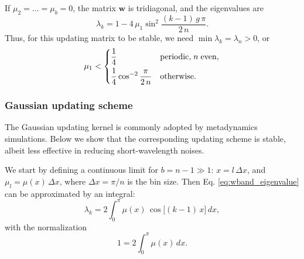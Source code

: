 \documentclass[reprint, floatfix]{revtex4-1}
\begin{document}
If $\mu_2 = \dots = \mu_b = 0$,
the matrix $\mathbf w$ is tridiagonal,
and the eigenvalues are
\begin{equation}
  \lambda_k
  =
  1 -
  4 \, \mu_1 \sin^2
  \frac{ (k - 1) \, g \, \pi }
       {       2 \, n        }
  .
\label{eq:wnn_eigenvalue}
\end{equation}
%
Thus, for this updating matrix to be stable,
we need
$\min \lambda_k = \lambda_n > 0$,
or
\begin{equation}
  \mu_1 <
  \begin{dcases}
    \frac 1 4
    & \mathrm{periodic, \;} n \mathrm{ \; even,}
    \\
    \frac 1 4
    \cos^{-2}\frac{  \pi   }
                  { 2 \, n }
    & \mathrm{otherwise}.
  \end{dcases}
\label{eq:nn_stable}
\end{equation}






\subsubsection{Gaussian updating scheme}



The Gaussian updating kernel is commonly
adopted by metadynamics simulations.
%
Below we show that the corresponding updating scheme
is stable, albeit less effective
in reducing short-wavelength noises.



We start by defining
a continuous limit
for $b = n - 1 \gg 1$:
$x = l \, \Delta x$,
and
$\mu_l = \mu(x) \, \Delta x$,
where
$\Delta x = \pi/n$
is the bin size.
%
Then
Eq. \eqref{eq:wband_eigenvalue}
can be approximated by an integral:
%
\begin{equation}
\lambda_k
=
2 \int_0^\pi
  \mu(x) \, \cos \bigl[ (k-1) \, x \bigr] \, dx,
\label{eq:lambda_int}
\end{equation}
%
with the normalization
%
\begin{equation}
1 = 2 \int_0^\pi \mu(x) \, dx.
\label{eq:mx_normalization}
\end{equation}
\end{document}
